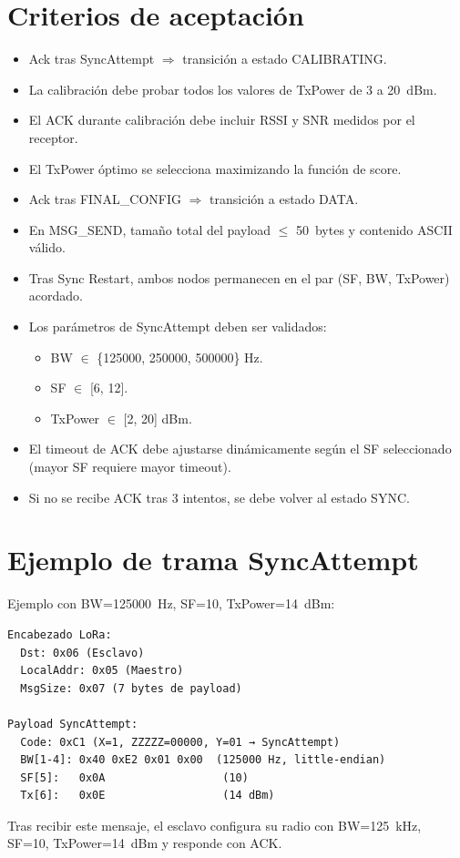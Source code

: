 \documentclass[11pt,a4paper]{article}
\begin{document}
\section{Criterios de aceptación}
\begin{itemize}
  \item Ack tras SyncAttempt $\Rightarrow$ transición a estado CALIBRATING.
  \item La calibración debe probar todos los valores de TxPower de 3 a 20~dBm.
  \item El ACK durante calibración debe incluir RSSI y SNR medidos por el receptor.
  \item El TxPower óptimo se selecciona maximizando la función de score.
  \item Ack tras FINAL\_CONFIG $\Rightarrow$ transición a estado DATA.
  \item En MSG\_SEND, tamaño total del payload $\leq$ 50~bytes y contenido ASCII válido.
  \item Tras Sync Restart, ambos nodos permanecen en el par (SF, BW, TxPower) acordado.
  \item Los parámetros de SyncAttempt deben ser validados:
    \begin{itemize}
      \item BW $\in$ \{125000, 250000, 500000\} Hz.
      \item SF $\in$ [6, 12].
      \item TxPower $\in$ [2, 20] dBm.
    \end{itemize}
  \item El timeout de ACK debe ajustarse dinámicamente según el SF seleccionado (mayor SF requiere mayor timeout).
  \item Si no se recibe ACK tras 3 intentos, se debe volver al estado SYNC.
\end{itemize}

\section{Ejemplo de trama SyncAttempt}

Ejemplo con BW=125000~Hz, SF=10, TxPower=14~dBm:

\begin{verbatim}
Encabezado LoRa:
  Dst: 0x06 (Esclavo)
  LocalAddr: 0x05 (Maestro)
  MsgSize: 0x07 (7 bytes de payload)

Payload SyncAttempt:
  Code: 0xC1 (X=1, ZZZZZ=00000, Y=01 → SyncAttempt)
  BW[1-4]: 0x40 0xE2 0x01 0x00  (125000 Hz, little-endian)
  SF[5]:   0x0A                  (10)
  Tx[6]:   0x0E                  (14 dBm)
\end{verbatim}

\noindent Tras recibir este mensaje, el esclavo configura su radio con BW=125~kHz, SF=10, TxPower=14~dBm y responde con ACK.
\end{document}
